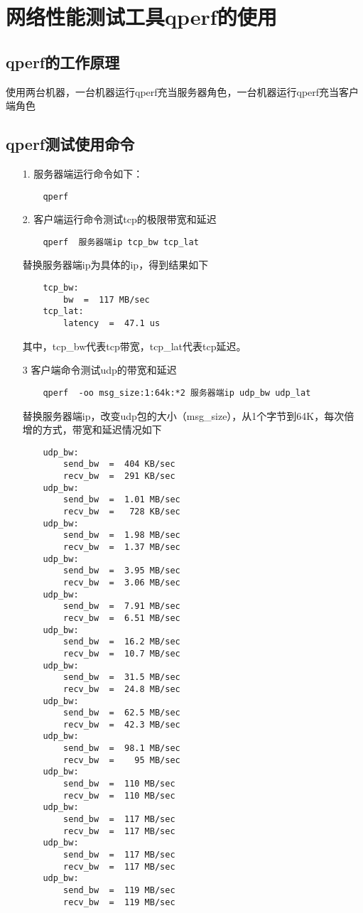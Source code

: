 \documentclass[a4paper,left=1.5cm,right=1.5cm,11pt]{article}
\begin{document}
\section{网络性能测试工具qperf的使用}
\subsection{qperf的工作原理}
使用两台机器，一台机器运行qperf充当服务器角色，一台机器运行qperf充当客户端角色
\subsection{qperf测试使用命令}
\begin{itemize}
	\item[1.]服务器端运行命令如下：
	\begin{lstlisting}
	qperf
	\end{lstlisting}
	\item[2.]客户端运行命令测试tcp的极限带宽和延迟
	\begin{lstlisting}
	qperf  服务器端ip tcp_bw tcp_lat
	\end{lstlisting}
	替换服务器端ip为具体的ip，得到结果如下
	\begin{lstlisting}
	tcp_bw:
		bw  =  117 MB/sec
	tcp_lat:
		latency  =  47.1 us
	\end{lstlisting}
	其中，tcp\_bw代表tcp带宽，tcp\_lat代表tcp延迟。
	\item[3]客户端命令测试udp的带宽和延迟
	\begin{lstlisting}
	qperf  -oo msg_size:1:64k:*2 服务器端ip udp_bw udp_lat
	\end{lstlisting}
	替换服务器端ip，改变udp包的大小（msg\_size），从1个字节到64K，每次倍增的方式，带宽和延迟情况如下
	\begin{lstlisting}
	udp_bw:
		send_bw  =  404 KB/sec
		recv_bw  =  291 KB/sec
	udp_bw:
		send_bw  =  1.01 MB/sec
		recv_bw  =   728 KB/sec
	udp_bw:
		send_bw  =  1.98 MB/sec
		recv_bw  =  1.37 MB/sec
	udp_bw:
		send_bw  =  3.95 MB/sec
		recv_bw  =  3.06 MB/sec
	udp_bw:
		send_bw  =  7.91 MB/sec
		recv_bw  =  6.51 MB/sec
	udp_bw:
		send_bw  =  16.2 MB/sec
		recv_bw  =  10.7 MB/sec
	udp_bw:
		send_bw  =  31.5 MB/sec
		recv_bw  =  24.8 MB/sec
	udp_bw:
		send_bw  =  62.5 MB/sec
		recv_bw  =  42.3 MB/sec
	udp_bw:
		send_bw  =  98.1 MB/sec
		recv_bw  =    95 MB/sec
	udp_bw:
		send_bw  =  110 MB/sec
		recv_bw  =  110 MB/sec
	udp_bw:
		send_bw  =  117 MB/sec
		recv_bw  =  117 MB/sec
	udp_bw:
		send_bw  =  117 MB/sec
		recv_bw  =  117 MB/sec
	udp_bw:
		send_bw  =  119 MB/sec
		recv_bw  =  119 MB/sec

\end{lstlisting}
\end{itemize}
\end{document}
